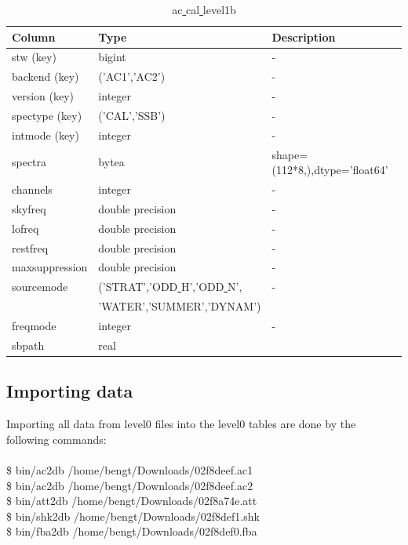 \documentclass[12pt]{article}
\begin{document}
\begin{table}[ht]
\caption{ac\underline{ }cal\underline{ }level1b}
\centering
\begin{tabular}{l l l}
\hline\hline
Column & Type & Description \\ [0.5ex]
\hline
 stw (key)           & bigint            &- \\
 backend (key)       & ('AC1','AC2')     & -\\
 version (key)       & integer           & -\\
 spectype (key)      & ('CAL','SSB')         & -\\
 intmode (key)       & integer           & -\\
 spectra        & bytea             & shape=(112*8,),dtype='float64'\\
 channels       & integer           & -\\
 skyfreq        & double precision  & -\\
 lofreq         & double precision  & -\\
 restfreq       & double precision  & -\\
 maxsuppression & double precision  & -\\
 sourcemode     & ('STRAT','ODD\underline{ }H','ODD\underline{ }N', & -\\
& 'WATER','SUMMER','DYNAM')   & \\
 freqmode       & integer           & -\\ 
 sbpath         & real              &\\[1ex]
\hline
\end{tabular}
\label{table:ac1a}
\end{table}

\clearpage
\newpage

\subsection{Importing data}
\label{sec:import}
Importing all data from level0 files into the level0 tables are done 
by the following commands:\\
\\
\$ bin/ac2db /home/bengt/Downloads/02f8deef.ac1\\
\$ bin/ac2db /home/bengt/Downloads/02f8deef.ac2\\
\$ bin/att2db /home/bengt/Downloads/02f8a74e.att\\
\$ bin/shk2db /home/bengt/Downloads/02f8def1.shk\\
\$ bin/fba2db /home/bengt/Downloads/02f8def0.fba\\
\end{document}

